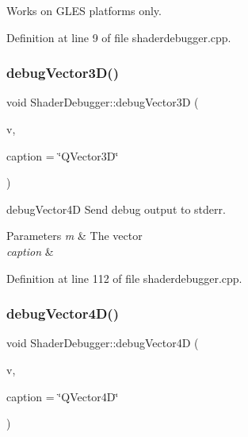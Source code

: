 Works on G\+L\+ES platforms only. 

Definition at line 9 of file shaderdebugger.\+cpp.

\mbox{\label{class_shader_debugger_afd6536a3c6c74c4b6af32ad128ba50d0}} 
\subsubsection{\texorpdfstring{debugVector3D()}{debugVector3D()}}
{\footnotesize\ttfamily void Shader\+Debugger\+::debug\+Vector3D (\begin{DoxyParamCaption}\item[{const Q\+Vector3D \&}]{v,  }\item[{const Q\+String \&}]{caption = {\ttfamily \char`\"{}QVector3D\char`\"{}} }\end{DoxyParamCaption})\hspace{0.3cm}{\ttfamily [static]}}



debug\+Vector4D Send debug output to stderr. 


\begin{DoxyParams}{Parameters}
{\em m} & The vector \\
\hline
{\em caption} & \\
\hline
\end{DoxyParams}


Definition at line 112 of file shaderdebugger.\+cpp.

\mbox{\label{class_shader_debugger_a457fa04849102556e946cafdf9ea553e}} 
\subsubsection{\texorpdfstring{debugVector4D()}{debugVector4D()}}
{\footnotesize\ttfamily void Shader\+Debugger\+::debug\+Vector4D (\begin{DoxyParamCaption}\item[{const Q\+Vector4D \&}]{v,  }\item[{const Q\+String \&}]{caption = {\ttfamily \char`\"{}QVector4D\char`\"{}} }\end{DoxyParamCaption})\hspace{0.3cm}{\ttfamily [static]}}



